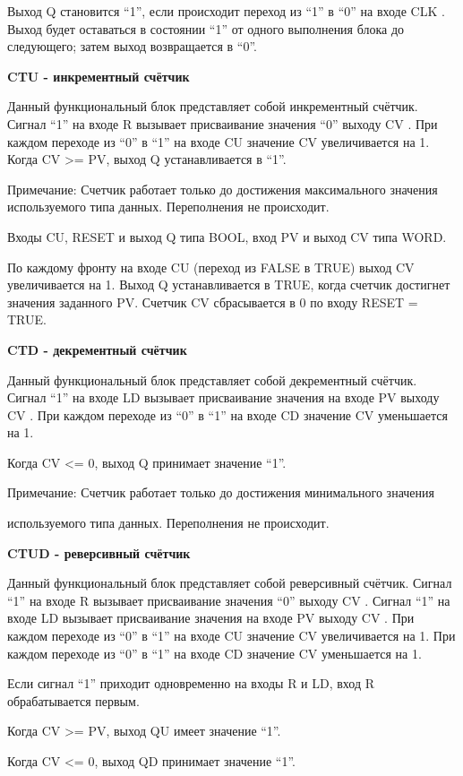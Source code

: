 \documentclass[letterpaper,10pt,russian]{sphinxmanual}
\begin{document}
Выход Q становится ``1'', если происходит переход из ``1'' в ``0'' на входе
CLK . Выход будет оставаться в состоянии ``1'' от одного выполнения блока
до следующего; затем выход возвращается в ``0''.

\textbf{CTU - инкрементный счётчик}

Данный функциональный блок представляет собой инкрементный счётчик.
Сигнал ``1'' на входе R вызывает присваивание значения ``0'' выходу CV . При
каждом переходе из ``0'' в ``1'' на входе CU значение CV увеличивается на 1.
Когда CV \textgreater{}= PV, выход Q устанавливается в ``1''.

Примечание: Счетчик работает только до достижения максимального значения
используемого типа данных. Переполнения не происходит.

Входы CU, RESET и выход Q типа BOOL, вход PV и выход CV типа WORD.

По каждому фронту на входе CU (переход из FALSE в TRUE) выход CV
увеличивается на 1. Выход Q устанавливается в TRUE, когда счетчик
достигнет значения заданного PV. Счетчик CV сбрасывается в 0 по входу
RESET = TRUE.

\textbf{CTD - декрементный счётчик}

Данный функциональный блок представляет собой декрементный счётчик.
Сигнал ``1'' на входе LD вызывает присваивание значения на входе PV выходу
CV . При каждом переходе из ``0'' в ``1'' на входе CD значение CV
уменьшается на 1.

Когда CV \textless{}= 0, выход Q принимает значение ``1''.

Примечание: Счетчик работает только до достижения минимального значения

используемого типа данных. Переполнения не происходит.

\textbf{CTUD - реверсивный счётчик}

Данный функциональный блок представляет собой реверсивный счётчик.
Сигнал ``1'' на входе R вызывает присваивание значения ``0'' выходу CV .
Сигнал ``1'' на входе LD вызывает присваивание значения на входе PV выходу
CV . При каждом переходе из ``0'' в ``1'' на входе CU значение CV
увеличивается на 1. При каждом переходе из ``0'' в ``1'' на входе CD
значение CV уменьшается на 1.

Если сигнал ``1'' приходит одновременно на входы R и LD, вход R
обрабатывается первым.

Когда CV \textgreater{}= PV, выход QU имеет значение ``1''.

Когда CV \textless{}= 0, выход QD принимает значение ``1''.
\end{document}
